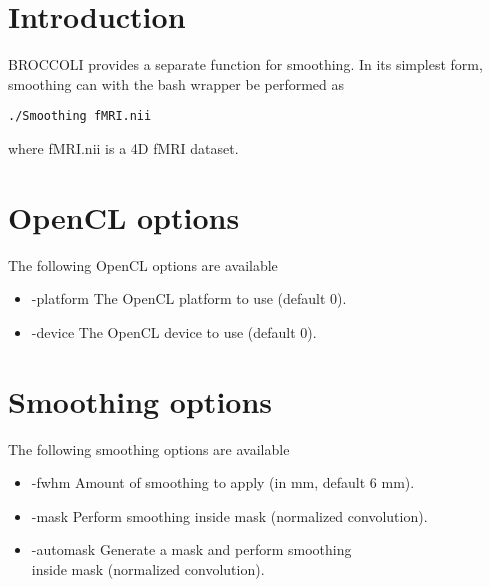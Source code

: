 \section{Introduction}

BROCCOLI provides a separate function for smoothing. In its simplest form, smoothing can with the bash wrapper be performed as

\begin{verbatim}
./Smoothing fMRI.nii
\end{verbatim}
where fMRI.nii is a 4D fMRI dataset.

\section{OpenCL options}

The following OpenCL options are available

\begin{itemize}

\item -platform
\newline \newline The OpenCL platform to use (default 0).

\item -device
\newline \newline The OpenCL device to use (default 0).

\end{itemize}

\section{Smoothing options}

The following smoothing options are available

\begin{itemize}

\item -fwhm
\newline \newline Amount of smoothing to apply (in mm, default 6 mm).

\item -mask
\newline \newline Perform smoothing inside mask (normalized convolution).

\item -automask
\newline \newline Generate a mask and perform smoothing \\ inside mask (normalized convolution).

\end{itemize}

